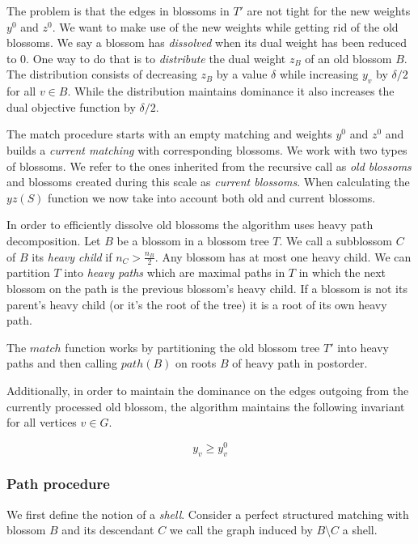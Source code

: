 The problem is that the edges in blossoms in $T'$ are not tight for the new weights $y^0$ and $z^0$. We want to make use of the new weights while getting rid of the old blossoms. We say a blossom has \textit{dissolved} when its dual weight has been reduced to $0$. One way to do that is to \textit{distribute} the dual weight $z_B$ of an old blossom $B$. The distribution consists of decreasing $z_B$ by a value $\delta$ while increasing $y_v$ by $\delta / 2$ for all $v \in B$. While the distribution maintains dominance it also increases the dual objective function by $\delta / 2$. 

The match procedure starts with an empty matching and weights $y^0$ and $z^0$ and builds a \textit{current matching} with corresponding blossoms. We work with two types of blossoms. We refer to the ones inherited from the recursive call as \textit{old blossoms} and blossoms created during this scale as \textit{current blossoms}. When calculating the $yz(S)$ function we now take into account both old and current blossoms.

In order to efficiently dissolve old blossoms the algorithm uses heavy path decomposition. Let $B$ be a blossom in a blossom tree $T$. We call a subblossom $C$ of $B$ its \textit{heavy child} if $n_C > \frac{n_B}{2}$. Any blossom has at most one heavy child. We can partition $T$ into \textit{heavy paths} which are maximal paths in $T$ in which the next blossom on the path is the previous blossom's heavy child. If a blossom is not its parent's heavy child (or it's the root of the tree) it is a root of its own heavy path.

The $match$ function works by partitioning the old blossom tree $T'$ into heavy paths and then calling $path(B)$ on roots $B$ of heavy path in postorder.

Additionally, in order to maintain the dominance on the edges outgoing from the currently processed old blossom, the algorithm maintains the following invariant for all vertices $v \in G$.

\begin{equation}\label{eq:4}
    y_v \geq y^0_v
\end{equation}

\subsubsection{Path procedure}

We first define the notion of a \textit{shell}. Consider a perfect structured matching with blossom $B$ and its descendant $C$ we call the graph induced by $B \setminus C$ a shell.

